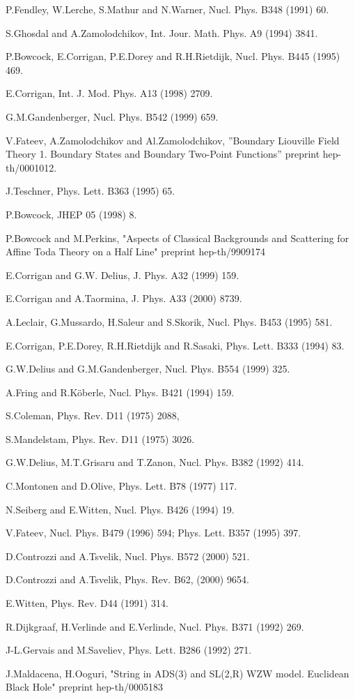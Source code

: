 \documentclass[a4paper,12pt]{article}
\begin{document}
\begin{thebibliography}{99}
  P.Fendley, W.Lerche, S.Mathur and N.Warner, Nucl. Phys. 
B348 (1991) 60.

  S.Ghosdal and A.Zamolodchikov, Int. Jour. Math. Phys. A9
(1994) 3841.

  P.Bowcock, E.Corrigan, P.E.Dorey and R.H.Rietdijk, Nucl.
Phys. B445 (1995) 469.

 E.Corrigan, Int. J. Mod. Phys. A13 (1998) 2709.

 G.M.Gandenberger, Nucl. Phys. B542 (1999) 659.

  V.Fateev, A.Zamolodchikov and Al.Zamolodchikov, ''Boundary
Liouville Field Theory 1. Boundary States and Boundary Two-Point Functions''
preprint hep-th/0001012.

 J.Teschner, Phys. Lett. B363 (1995) 65.

  P.Bowcock, JHEP 05 (1998) 8.

  P.Bowcock and M.Perkins, "Aspects of Classical Backgrounds and 
Scattering for Affine Toda Theory on a Half Line" preprint hep-th/9909174

  E.Corrigan and G.W. Delius, J. Phys. A32 (1999) 159.

  E.Corrigan and A.Taormina, J. Phys. A33 (2000) 8739.

  A.Leclair, G.Mussardo, H.Saleur and S.Skorik, Nucl. Phys. 
B453 (1995) 581.

  E.Corrigan, P.E.Dorey, R.H.Rietdijk and R.Sasaki, Phys.
Lett. B333 (1994) 83.

  G.W.Delius and G.M.Gandenberger, Nucl. Phys. B554 (1999)
325.

  A.Fring and R.K\"{o}berle, Nucl. Phys. B421 (1994) 159.

  S.Coleman, Phys. Rev. D11 (1975) 2088,

S.Mandelstam, Phys. Rev. D11 (1975) 3026.

  G.W.Delius, M.T.Grisaru and T.Zanon, Nucl. Phys. B382 (1992)
414.

  C.Montonen and D.Olive, Phys. Lett. B78 (1977) 117.

  N.Seiberg and E.Witten, Nucl. Phys. B426 (1994) 19.

  V.Fateev, Nucl. Phys. B479 (1996) 594; 
Phys. Lett. B357 (1995) 397.

  D.Controzzi and A.Tsvelik, Nucl. Phys. B572 (2000) 521.

D.Controzzi and A.Tsvelik,  Phys. Rev. B62, (2000) 9654.

  E.Witten, Phys. Rev. D44 (1991) 314.

  R.Dijkgraaf, H.Verlinde and E.Verlinde, Nucl. Phys. B371
(1992) 269.

  J-L.Gervais and M.Saveliev, Phys. Lett. B286 (1992) 271.

  J.Maldacena, H.Ooguri, "String in ADS(3) and SL(2,R) WZW model. 
Euclidean Black Hole" preprint hep-th/0005183

\end{thebibliography}
\end{document}
